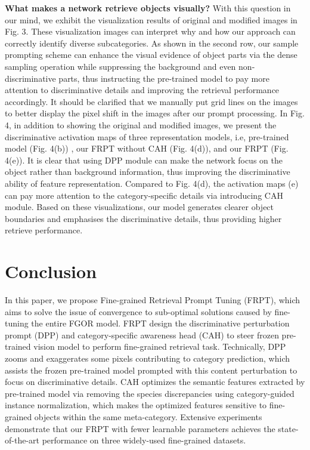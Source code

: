 \documentclass[letterpaper]{article} %
\begin{document}
\textbf{What makes a network retrieve objects visually?} With this question in our mind, we exhibit the visualization results of original and modified images in Fig. 3. These visualization images can interpret why and how our approach can correctly identify diverse subcategories. As shown in the second row, our sample prompting scheme can enhance the visual evidence of object parts via the dense sampling operation while suppressing the background and even non-discriminative parts, thus instructing the pre-trained model to pay more attention to discriminative details and improving the retrieval performance accordingly.
It should be clarified that we manually put grid lines on the images to better display the pixel shift in the images after our prompt processing. In Fig. 4, in addition to showing the original and modified images, we present the discriminative activation maps of three representation models, i.e, pre-trained model (Fig. 4(b)) , our FRPT without CAH (Fig. 4(d)), and our FRPT (Fig. 4(e)). It is clear that using DPP module can make the network focus on the object rather than background information, thus improving the discriminative ability of feature representation. Compared to Fig. 4(d), the activation maps (e) can pay more attention to the category-specific details via introducing CAH module. Based on these visualizations, our model generates clearer object boundaries and emphasises the discriminative details, thus providing higher retrieve performance.





\vspace{-0.93mm}
\vspace{-1.59mm}
\section{Conclusion}
In this paper, we propose Fine-grained Retrieval Prompt Tuning (FRPT), which aims to solve the issue of convergence to sub-optimal solutions caused by fine-tuning the entire FGOR model. FRPT design the discriminative perturbation prompt (DPP) and category-specific awareness head (CAH) to steer frozen pre-trained vision model to perform fine-grained retrieval task.
Technically, DPP zooms and exaggerates some pixels contributing to category prediction, which assists the frozen pre-trained model prompted with this content perturbation to focus on discriminative details.
CAH optimizes the semantic features extracted by pre-trained model via removing the species discrepancies using category-guided instance normalization,  which makes the optimized features sensitive to fine-grained objects within the same meta-category.
Extensive experiments demonstrate that our FRPT with fewer learnable parameters achieves the state-of-the-art performance on three widely-used fine-grained datasets.
\vspace{-0.89mm}
\end{document}
